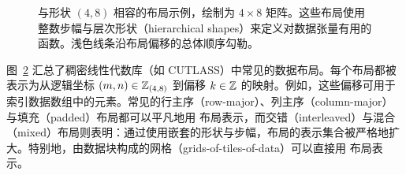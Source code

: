 \begin{figure}[ht]
\begin{subfigure}[t]{0.3\textwidth}
  \label{fig:layouts:broadcast}
\end{subfigure}
\caption{与形状 $(4,8)$ 相容的布局示例，绘制为 $4 {\times} 8$ 矩阵。这些布局使用整数步幅与层次形状（hierarchical shapes）来定义对数据张量有用的函数。浅色线条沿布局偏移的总体顺序勾勒。}
\label{fig:layouts}
\end{figure}

图~\ref{fig:layouts} 汇总了稠密线性代数库（如 CUTLASS）中常见的数据布局。每个布局都被表示为从逻辑坐标 $(m,n) \in \mathbb{Z}_{(4,8)}$ 到偏移 $k \in \mathbb{Z}$ 的映射。例如，这些偏移可用于索引数据数组中的元素。常见的行主序（row-major）、列主序（column-major）与填充（padded）布局都可以平凡地用 \CuTe 布局表示，而交错（interleaved）与混合（mixed）布局则表明：通过使用嵌套的形状与步幅，布局的表示集合被严格地扩大。特别地，由数据块构成的网格（grids-of-tiles-of-data）可以直接用 \CuTe 布局表示。

